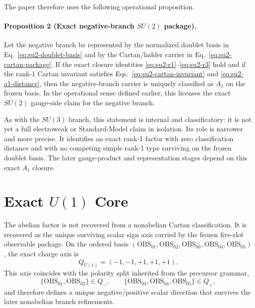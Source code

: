 \documentclass[11pt]{article}
\begin{document}
The paper therefore uses the following operational proposition.

\paragraph{Proposition 2 (Exact negative-branch $SU(2)$ package).}
Let the negative branch be represented by the normalized doublet basis in Eq.~\eqref{eq:su2-doublet-basis} and by the Cartan/ladder carrier in Eq.~\eqref{eq:su2-cartan-package}. If the exact closure identities \eqref{eq:su2-r1}--\eqref{eq:su2-r3} hold and if the rank-1 Cartan invariant satisfies Eqs.~\eqref{eq:su2-cartan-invariant} and \eqref{eq:su2-a1-distance}, then the negative-branch carrier is uniquely classified as $A_1$ on the frozen basis. In the operational sense defined earlier, this licenses the exact $SU(2)$ gauge-side claim for the negative branch.

As with the $SU(3)$ branch, this statement is internal and classificatory: it is not yet a full electroweak or Standard-Model claim in isolation. Its role is narrower and more precise. It identifies an exact rank-1 factor with zero classification distance and with no competing simple rank-1 type surviving on the frozen doublet basis. The later gauge-product and representation stages depend on this exact $A_1$ closure.


\section{Exact \texorpdfstring{$U(1)$}{U(1)} Core}
The abelian factor is not recovered from a nonabelian Cartan classification. It is recovered as the unique surviving scalar sign axis carried by the frozen five-slot observable package. On the ordered basis $(\mathrm{OBS}_{01},\mathrm{OBS}_{02},\mathrm{OBS}_{03},\mathrm{OBS}_{04},\mathrm{OBS}_{05})$, the exact charge axis is
\begin{equation}
Q_{U(1)} = (-1,-1,+1,+1,+1).
\label{eq:u1-charge-axis}
\end{equation}
This axis coincides with the polarity split inherited from the precursor grammar,
\begin{equation}
\{\mathrm{OBS}_{01},\mathrm{OBS}_{02}\}\in Q_{-},
\qquad
\{\mathrm{OBS}_{03},\mathrm{OBS}_{04},\mathrm{OBS}_{05}\}\in Q_{+},
\label{eq:u1-sector-split}
\end{equation}
and therefore defines a unique negative/positive scalar direction that survives the later nonabelian branch refinements.
\end{document}
